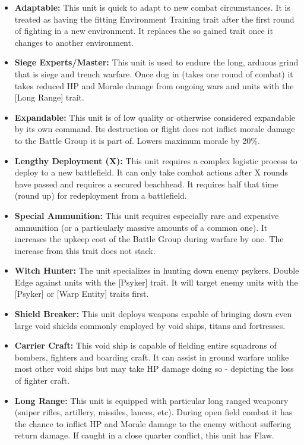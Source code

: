\begin{itemize}
 	\item \textbf{Adaptable:} This unit is quick to adapt to new combat circumstances. It is treated as having the fitting Environment Training trait after the first round of fighting in a new environment. It replaces the so gained trait once it changes to another environment.
 	\item \textbf{Siege Experts/Master:} This unit is used to endure the long, arduous grind that is siege and trench warfare. Once dug in (takes one round of combat) it takes reduced HP and Morale damage from ongoing wars and units with the [Long Range] trait.
 	\item \textbf{Expandable:} This unit is of low quality or otherwise considered expandable by its own command. Its destruction or flight does not inflict morale damage to the Battle Group it is part of. Lowers maximum morale by 20\%.
 	\item \textbf{Lengthy Deployment (X):} This unit requires a complex logistic process to deploy to a new battlefield. It can only take combat actions after X rounds have passed and requires a secured beachhead. It requires half that time (round up) for redeployment from a battlefield. 
 	\item \textbf{Special Ammunition:} This unit requires especially rare and expensive ammunition (or a particularly massive amounts of a common one). It increases the upkeep cost of the Battle Group during warfare by one. The increase from this trait does not stack.
 	\item \textbf{Witch Hunter:} The unit specializes in hunting down enemy psykers. Double Edge against units with the [Psyker] trait. It will target enemy units with the [Psyker] or [Warp Entity] traits first.
 	\item \textbf{Shield Breaker:} This unit deploys weapons capable of bringing down even large void shields commonly employed by void ships, titans and fortresses.
 	\item \textbf{Carrier Craft:} This void ship is capable of fielding entire squadrons of bombers, fighters and boarding craft. It can assist in ground warfare unlike most other void ships but may take HP damage doing so - depicting the loss of fighter craft.
 	\item \textbf{Long Range:} This unit is equipped with particular long ranged weaponry (sniper rifles, artillery, missiles, lances, etc). During open field combat it has the chance to inflict HP and Morale damage to the enemy without suffering return damage. If caught in a close quarter conflict, this unit has Flaw.

\end{itemize}
